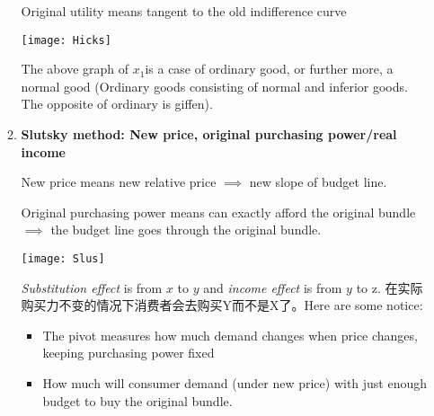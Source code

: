 \documentclass[10pt]{article}
\newenvironment{changemargin}[2]{%
  \begin{list}{}{%
    \setlength{\topsep}{0pt}%
    \setlength{\leftmargin}{#1}%
    \setlength{\rightmargin}{#2}%
    \setlength{\listparindent}{\parindent}%
    \setlength{\itemindent}{\parindent}%
    \setlength{\parsep}{\parskip}%
  }%
  \item[]}{\end{list}}
\begin{document}
\begin{changemargin}{-0.125in}{0in}
\begin{enumerate}
\begin{enumerate}
                  \smallskip
                  
                  Original utility means tangent to the old indifference curve
                  
                  \smallskip
                  
                  \smallskip
                  
                  \begin{center}
                  \texttt{[image: Hicks]}
                  \end{center}
                  The above graph of $x_1$is a case of ordinary good, or further more, a normal good (Ordinary goods consisting of normal and inferior goods. The opposite of ordinary is giffen).
                  \smallskip
                  
                  
                  \item
                  \textbf{Slutsky method: New price, original purchasing power/real income}
                
                \smallskip

                New price means new relative price $\implies$ new slope of budget line. 
                 
                 \smallskip

                Original purchasing power means can exactly afford the original bundle $\implies$ the budget line goes through the original bundle.
                  
                   \bigskip
                   
                   \smallskip

                 \begin{center}
                 \texttt{[image: Slus]}
                 \end{center}
                 
                 \bigskip
                 
                 \smallskip
                 
                 \textit{Substitution effect} is from $x$ to $y$ and \textit{income effect} is from $y$ to z.
                     在实际购买力不变的情况下消费者会去购买Y而不是X了。Here are some notice:
                      \begin{itemize}
                        \item The pivot measures how much demand changes when price changes, keeping purchasing power fixed
                        \item How much will consumer demand (under new price) with just enough budget to buy the original bundle.
                      \end{itemize}
                      

\end{enumerate}
\end{enumerate}
\end{changemargin}
\end{document}

